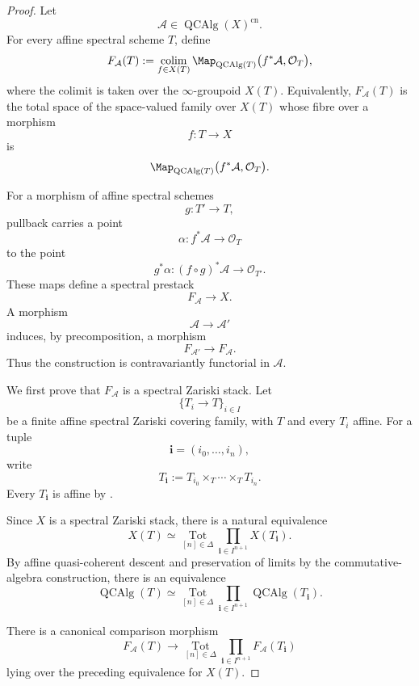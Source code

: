 \begin{proof}
Let
\[
    \mathcal A
    \in
    \operatorname{QCAlg}(X)^{\mathrm{cn}}.
\]
For every affine spectral scheme $T$, define
\[
    F_{\mathcal A}(T)
    :=
    \operatorname*{colim}_{f\in X(T)}
    \Map_{\operatorname{QCAlg}(T)}
    \bigl(
        f^*\mathcal A,
        \mathcal O_T
    \bigr),
\]
where the colimit is taken over the $\infty$-groupoid $X(T)$.
Equivalently, $F_{\mathcal A}(T)$ is the total space of the
space-valued family over $X(T)$ whose fibre over a morphism
\[
    f
    \colon
    T
    \longrightarrow
    X
\]
is
\[
    \Map_{\operatorname{QCAlg}(T)}
    \bigl(
        f^*\mathcal A,
        \mathcal O_T
    \bigr).
\]

For a morphism of affine spectral schemes
\[
    g
    \colon
    T'
    \longrightarrow
    T,
\]
pullback carries a point
\[
    \alpha
    \colon
    f^*\mathcal A
    \longrightarrow
    \mathcal O_T
\]
to the point
\[
    g^*\alpha
    \colon
    (f\circ g)^*\mathcal A
    \longrightarrow
    \mathcal O_{T'}.
\]
These maps define a spectral prestack
\[
    F_{\mathcal A}
    \longrightarrow
    X.
\]
A morphism
\[
    \mathcal A
    \longrightarrow
    \mathcal A'
\]
induces, by precomposition, a morphism
\[
    F_{\mathcal A'}
    \longrightarrow
    F_{\mathcal A}.
\]
Thus the construction is contravariantly functorial in $\mathcal A$.

We first prove that $F_{\mathcal A}$ is a spectral Zariski stack. Let
\[
    \{T_i\to T\}_{i\in I}
\]
be a finite affine spectral Zariski covering family, with $T$ and every
$T_i$ affine. For a tuple
\[
    \mathbf i
    =
    (i_0,\ldots,i_n),
\]
write
\[
    T_{\mathbf i}
    :=
    T_{i_0}
    \times_T
    \cdots
    \times_T
    T_{i_n}.
\]
Every $T_{\mathbf i}$ is affine by
.

Since $X$ is a spectral Zariski stack, there is a natural equivalence
\[
    X(T)
    \simeq
    \operatorname*{Tot}_{[n]\in\Delta}
    \prod_{\mathbf i\in I^{n+1}}
    X(T_{\mathbf i}).
\]
By affine quasi-coherent descent and preservation of limits by the
commutative-algebra construction, there is an equivalence
\[
    \operatorname{QCAlg}(T)
    \simeq
    \operatorname*{Tot}_{[n]\in\Delta}
    \prod_{\mathbf i\in I^{n+1}}
    \operatorname{QCAlg}(T_{\mathbf i}).
\]

There is a canonical comparison morphism
\[
    F_{\mathcal A}(T)
    \longrightarrow
    \operatorname*{Tot}_{[n]\in\Delta}
    \prod_{\mathbf i\in I^{n+1}}
    F_{\mathcal A}(T_{\mathbf i})
\]
lying over the preceding equivalence for $X(T)$.


\end{proof}
